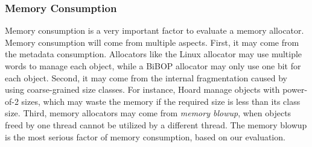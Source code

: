 \subsubsection{Memory Consumption}

Memory consumption is a very important factor to evaluate a memory allocator. Memory consumption will come from multiple aspects. First, it may come from the metadata consumption. Allocators like the Linux allocator may use multiple words to manage each object, while a BiBOP allocator may only use one bit for each object. Second, it may come from the internal fragmentation caused by using coarse-grained size classes. For instance, Hoard manage objects with power-of-2 sizes, which may waste the memory if the required size is less than its class size. Third, memory allocators may come from \textit{memory blowup}, when objects freed by one thread cannot be utilized by a different thread. The memory blowup is the most serious factor of memory consumption, based on our evaluation. 





